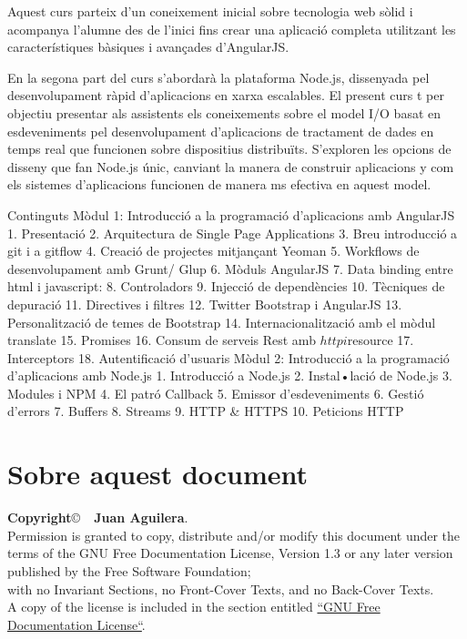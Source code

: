 \documentclass[a4paper]{article}
\begin{document}
Aquest curs parteix d’un coneixement inicial sobre tecnologia web sòlid i acompanya l’alumne des de l’inici fins crear una aplicació completa utilitzant les característiques bàsiques i avançades d’AngularJS. 

En la segona part del curs s’abordarà la plataforma Node.js, dissenyada pel desenvolupament ràpid d’aplicacions en xarxa escalables. 
El present curs t per objectiu presentar als assistents els coneixements sobre el model I/O basat en esdeveniments pel desenvolupament d’aplicacions de tractament de dades en temps real que funcionen sobre dispositius distribuïts. 
S’exploren les opcions de disseny que fan Node.js únic, canviant la manera de construir aplicacions y com els sistemes d’aplicacions funcionen de manera ms efectiva en aquest model. 
 	 
Continguts  	Mòdul 1: Introducció a la programació d’aplicacions amb AngularJS
1. Presentació
2. Arquitectura de Single Page Applications
3. Breu introducció a git i a git­flow
4. Creació de projectes mitjançant Yeoman
5. Workflows de desenvolupament amb Grunt/ Glup
6. Mòduls AngularJS
7. Data binding entre html i javascript: %
8. Controladors
9. Injecció de dependències
10. Tècniques de depuració
11. Directives i filtres
12. Twitter Bootstrap i AngularJS
13. Personalització de temes de Bootstrap
14. Internacionalització amb el mòdul translate
15. Promises
16. Consum de serveis Rest amb $http i $resource
17. Interceptors
18. Autentificació d’usuaris
Mòdul 2: Introducció a la programació d’aplicacions amb Node.js
1. Introducció a Node.js
2. Instal•lació de Node.js
3. Modules i NPM
4. El patró Callback 
5. Emissor d’esdeveniments 
6. Gestió d’errors 
7. Buffers
8. Streams
9. HTTP & HTTPS
10. Peticions HTTP 
\section{Sobre aquest document}
\textbf{Copyright}\copyright\ \textbf{\the\year\ Juan Aguilera}.\\
Permission is granted to copy, distribute and/or modify this document under the terms of the GNU Free Documentation License, Version 1.3 or any later version published by the Free Software Foundation;\\
with no Invariant Sections, no Front-Cover Texts, and no Back-Cover Texts.\\
A copy of the license is included in the section entitled \href{http://www.gnu.org/licenses/fdl.html}{``GNU Free Documentation License``}.

\begin{thebibliography}{99}
	\bibitem{<++>} 
\end{thebibliography}
\end{document}
